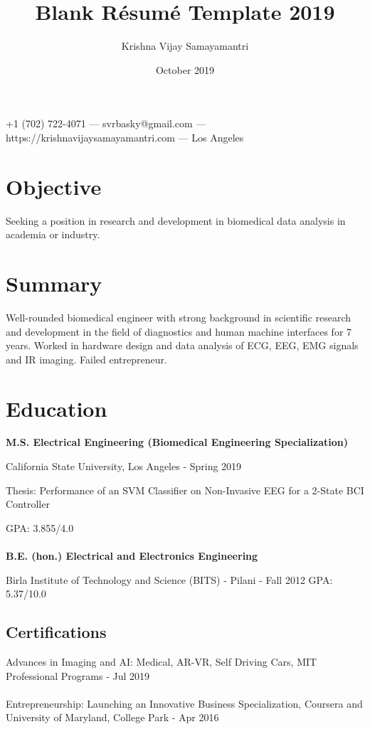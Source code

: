 \documentclass{article}
\makeatletter
\renewcommand{\maketitle}{
\begin{center}
    {\huge\bfseries
    \theauthor}
    
    \vspace{.25em}
    +1 (702) 722-4071 ---
    svrbasky@gmail.com --- https://krishnavijaysamayamantri.com ---
    Los Angeles
\end{center}
}
\makeatother
\begin{document}
\title{Blank R\'esum\'e Template 2019}
\author{Krishna Vijay Samayamantri}
\date{October 2019}
\maketitle


\section{Objective}
Seeking a position in research and development in biomedical data analysis in academia or industry.

\section{Summary}
Well-rounded biomedical engineer with strong background in scientific research and development in the field of diagnostics and human machine interfaces for 7 years. Worked in hardware design and data analysis of ECG, EEG, EMG signals and IR imaging. Failed entrepreneur.

\section{Education}
\textbf{M.S. Electrical Engineering (Biomedical Engineering Specialization)}

\noindent   
California State University, Los Angeles - Spring 2019

\noindent   
Thesis: Performance of an SVM Classifier on Non-Invasive EEG for a 2-State BCI Controller 

\noindent
GPA: 3.855/4.0 \\
\\

\noindent
\textbf{B.E. (hon.) Electrical and Electronics Engineering}

\noindent
Birla Institute of Technology and Science (BITS) - Pilani - Fall 2012
\noindent
GPA: 5.37/10.0

\subsection{Certifications}
Advances in Imaging and AI: Medical, AR-VR, Self Driving Cars, MIT Professional Programs - Jul 2019
\\
\\
\noindent
Entrepreneurship: Launching an Innovative Business Specialization, Coursera and University of Maryland, College Park - Apr 2016
\end{document}
